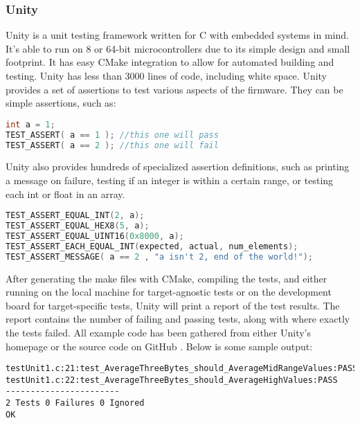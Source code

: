 \subsubsection{Unity}
Unity is a unit testing framework written for C with embedded systems in mind.
It's able to run on 8 or 64-bit microcontrollers due to its simple design and
small footprint. It has easy CMake integration to allow for automated building
and testing. Unity has less than 3000 lines of code, including white space.
Unity provides a set of assertions to test various aspects of the firmware. They
can be simple assertions, such as:

\begin{lstlisting}[language=C, caption=Unity Basic Assertion Example
\cite{unity-homepage}]
int a = 1;
TEST_ASSERT( a == 1 ); //this one will pass
TEST_ASSERT( a == 2 ); //this one will fail
\end{lstlisting}

Unity also provides hundreds of specialized assertion definitions, such as
printing a message on failure, testing if an integer is within a certain range,
or testing each int or float in an array.

\begin{lstlisting}[language=c, caption=More advanced Unity Assertions
\cite{unity-github}]
TEST_ASSERT_EQUAL_INT(2, a);
TEST_ASSERT_EQUAL_HEX8(5, a);
TEST_ASSERT_EQUAL_UINT16(0x8000, a);
TEST_ASSERT_EACH_EQUAL_INT(expected, actual, num_elements);
TEST_ASSERT_MESSAGE( a == 2 , "a isn't 2, end of the world!");
\end{lstlisting}

After generating the make files with CMake, compiling the tests, and either
running on the local machine for target-agnostic tests or on the development
board for target-specific tests, Unity will print a report of the test results.
The report contains the number of failing and passing tests, along with where
exactly the tests failed. All example code has been gathered from either Unity's
homepage \cite{unity-homepage} or the source code on GitHub \cite{unity-github}.
Below is some sample output:

\begin{lstlisting}[caption=Example Unity Test Report Output \cite{unity-homepage}]
testUnit1.c:21:test_AverageThreeBytes_should_AverageMidRangeValues:PASS
testUnit1.c:22:test_AverageThreeBytes_should_AverageHighValues:PASS
-----------------------
2 Tests 0 Failures 0 Ignored
OK
\end{lstlisting}
